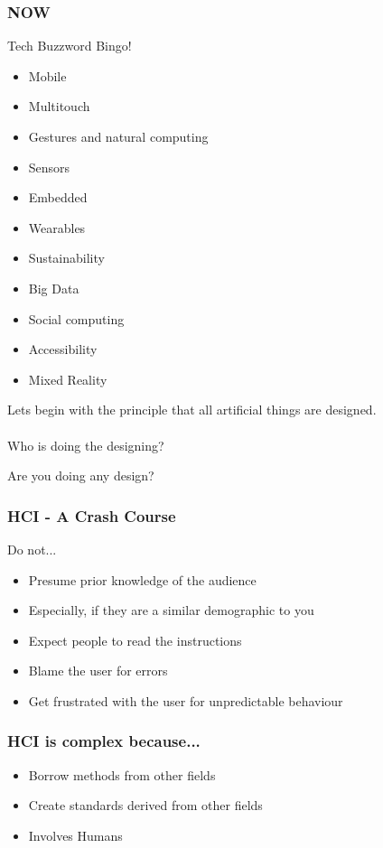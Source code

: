 \begin{frame}
	\frametitle{NOW}
	\begin{center}
		Tech Buzzword Bingo!
	\end{center}
	\begin{itemize}
		\item Mobile
		\item Multitouch
		\item Gestures and natural computing
		\item Sensors
		\item Embedded
		\item Wearables
		\item Sustainability
		\item Big Data
		\item Social computing
		\item Accessibility
		\item Mixed Reality
	\end{itemize}
\end{frame}

\begin{frame}
	Lets begin with the principle that all artificial things are designed. \\ ~ \\
	
	Who is doing the designing?
	\begin{center}
		\pause Are you doing any design? 
	\end{center}
\end{frame}

\begin{frame}
	\frametitle{HCI - A Crash Course}
	\begin{center}
		\huge Do not...
	\end{center}
	\begin{itemize}
		\item Presume prior knowledge of the audience
		\item Especially, if they are a similar demographic to you
		\item Expect people to read the instructions
		\item Blame the user for errors
		\item Get frustrated with the user for unpredictable behaviour
	\end{itemize}
\end{frame}

\begin{frame}
	\frametitle{HCI is complex because...}
	\begin{itemize}
		\item Borrow methods from other fields
		\item Create standards derived from other fields
		\item Involves Humans
	\end{itemize}
\end{frame}

